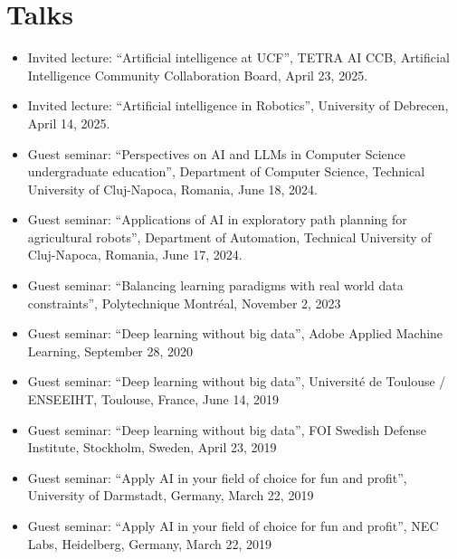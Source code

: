 \section{Talks}

\begin{itemize}[nosep, noitemsep]

    \item Invited lecture: ``Artificial intelligence at UCF'', TETRA AI CCB, Artificial Intelligence Community Collaboration Board, April 23, 2025.

    \item Invited lecture: ``Artificial intelligence in Robotics'', University of Debrecen, April 14, 2025.     

    \item Guest seminar: ``Perspectives on AI and LLMs in Computer Science undergraduate education'', Department of Computer Science, Technical University of Cluj-Napoca, Romania, June 18, 2024.

    \item Guest seminar: ``Applications of AI in exploratory path planning for agricultural robots'', Department of Automation, Technical University of Cluj-Napoca, Romania, June 17, 2024.

    \item Guest seminar: ``Balancing learning paradigms with real world data constraints'', Polytechnique Montréal, November 2, 2023
    
    \item Guest seminar: ``Deep learning without big data'',
      Adobe Applied Machine Learning, September 28, 2020
    
    \item Guest seminar: ``Deep learning without big data'',
      Universit{\'e} de Toulouse / ENSEEIHT, Toulouse, France, June 14, 2019
    
    \item Guest seminar: ``Deep learning without big data'',
    FOI Swedish Defense Institute, Stockholm, Sweden, April 23, 2019
    
    \item Guest seminar: ``Apply AI in your field of choice for fun and profit'',
                University of Darmstadt, Germany, March 22, 2019
    
    \item Guest seminar: ``Apply AI in your field of choice for fun and profit'',
            NEC Labs, Heidelberg, Germany, March 22, 2019
    

\end{itemize}

